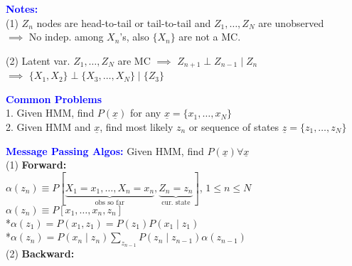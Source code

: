 \documentclass[5pt]{extarticle} %
\begin{document}
\begin{paracol}{3}
{    \textcolor{blue}{\textbf{Notes:}} \\
    (1) $Z_n$ nodes are head-to-tail or tail-to-tail and $Z_1,\ldots,Z_N$ are unobserved\\
    $\implies$ No indep. among $X_n$'s, also $\{X_n\}$ are not a MC.

    (2) Latent var. $Z_1,\ldots,Z_N$ are MC $\implies$ $Z_{n+1} \perp Z_{n-1} \mid Z_n$ \\
    $\implies$ $\{X_1,X_2\} \perp \{X_3,\ldots,X_N\} \mid \{Z_3\}$

    \textcolor{blue}{\textbf{Common Problems}} \\ 
    1. Given HMM, find $P(\underline{x})$ for any $\underline{x} = \{x_1,\ldots,x_N\}$ \\
    2. Given HMM and $\underline{x}$, find most likely $z_n$ or sequence of states $\underline{z} = \{z_1,\ldots,z_N\}$ 

    \textcolor{blue}{\textbf{Message Passing Algos:}} Given HMM, find $P(\underline{x}) \forall \underline{x}$ \\
    (1) \textbf{Forward:} \\
    $\alpha(z_n) \equiv P[\underbrace{X_1 = x_1,\ldots,X_n=x_n}_{\text{obs so far}}, \underbrace{Z_n = z_n}_{\text{cur. state}}]$, $1 \leq n \leq N$\\
    $\alpha(z_n) \equiv P[x_1,\ldots,x_n,z_n]$ \\
    *$\alpha(z_1) = P(x_1,z_1) = P(z_1)P(x_1 \mid z_1)$ \\
    *$\alpha(z_n) = P(x_n \mid z_n) \sum_{z_{n-1}} P(z_n \mid z_{n-1}) \alpha(z_{n-1})$ \\
    (2) \textbf{Backward:} \\


    



    }
\end{paracol}
\end{document}
